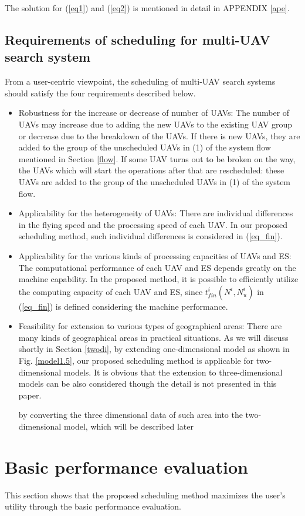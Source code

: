\documentclass{ieeeaccess}
\begin{document}
The solution for (\ref{eq1}) and (\ref{eq2}) is mentioned in detail in APPENDIX \ref{ape}.

\subsection{Requirements of scheduling for multi-UAV search system} \label{feature}
From a user-centric viewpoint, the scheduling of multi-UAV search systems should satisfy the four requirements described below.
\begin{itemize}
\item Robustness for the increase or decrease of number of UAVs: 
The number of UAVs may increase due to adding the new UAVs to the existing UAV group or decrease due to the breakdown of the UAVs. 
If there is new UAVs, they are added to the group of the unscheduled UAVs in (1) of the system flow mentioned in Section \ref{flow}.
If some UAV turns out to be broken on the way, the UAVs which will start the operations after that are rescheduled: these UAVs   are added to the group of the unscheduled UAVs in (1) of the system flow.
%
\item Applicability for the heterogeneity of UAVs: 
There are individual differences in the flying speed and the processing speed of each UAV. 
In our proposed scheduling method, such individual differences is considered in (\ref{eq_fin}).
%
\item Applicability for the various kinds of processing capacities of UAVs and ES: 
The computational performance of each UAV and ES depends greatly on the machine capability. In the proposed method, it is possible to efficiently utilize the computing capacity of each UAV and ES, since $t_{fin}^i(N^i,N_u^i)$ in (\ref{eq_fin}) is defined considering the machine performance.
%
\item Feasibility for extension to various types of geographical areas: 
There are many kinds of geographical areas in practical situations.
As we will discuss shortly in Section \ref{twodi}, by extending one-dimensional model as shown in Fig. \ref{model1.5}, our proposed scheduling method is applicable for two-dimensional models.
It is obvious that the extension to three-dimensional models can be also considered though the detail is not presented in this paper.

by converting the three dimensional data of such area into the two-dimensional model, which will be described later 
\end{itemize}

\section{Basic performance evaluation}\label{eva}
This section shows that the proposed scheduling method maximizes the user's utility through the basic performance evaluation.
\end{document}
